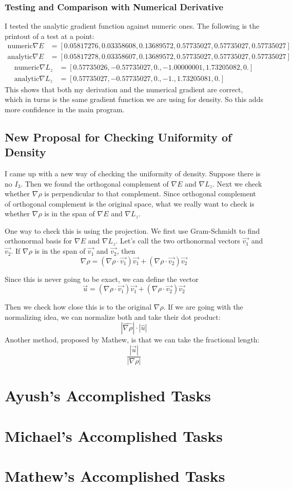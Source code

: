 \documentclass[12pt]{article}
\begin{document}
\subsubsection{Testing and Comparison with Numerical Derivative}
I tested the analytic gradient function against numeric ones. The following is the printout of a test at a point:
\begin{align*}
\text{numeric} \nabla E &=  [0.05817276, 0.03358608, 0.13689572, 0.57735027, 0.57735027, 0.57735027]\\
\text{analytic} \nabla E &= [0.05817278, 0.03358607, 0.13689572, 0.57735027, 0.57735027, 0.57735027]
\end{align*}
\begin{align*}
 \text{numeric} \nabla L_z &=  [ 0.57735026, -0.57735027,  0.,         -1.00000001,  1.73205082,  0.        ] \\
 \text{analytic} \nabla L_z &= [ 0.57735027, -0.57735027,  0.,         -1.,          1.73205081,  0.        ] 
\end{align*}
This shows that both my derivation and the numerical gradient are correct, which in turns is the same gradient function we are using for density. So this adds more confidence in the main program.

\subsection{New Proposal for Checking Uniformity of Density}
I came up with a new way of checking the uniformity of density. Suppose there is  no $I_3$. Then we found the orthogonal complement of $\nabla E$ and $\nabla L_z$. Next we check whether $\nabla \rho$ is perpendicular to that complement. Since orthogonal complement of orthogonal complement is the original space, what we really want to check is whether $\nabla \rho$ is in the span of $\nabla E$ and $\nabla L_z$.

One way to check this is using the projection. We first use Gram-Schmidt to find orthonormal basis for $\nabla E$ and $\nabla L_z$. Let's call the two orthonormal vectors $\vec{v_1}$ and $\vec{v_2}$. If $\nabla \rho$ is in the span of $\vec{v_1}$ and $\vec{v_2}$, then $$\nabla \rho = (\nabla \rho \cdot \vec{v_1}) \vec{v_1} + (\nabla \rho \cdot \vec{v_2}) \vec{v_2} $$

Since this is never going to be exact, we can define the vector
$$ \vec{u} = (\nabla \rho \cdot \vec{v_1}) \vec{v_1} + (\nabla \rho \cdot \vec{v_2}) \vec{v_2} $$

Then we check how close this is to the original $\nabla \rho$. If we are going with the normalizing idea, we can normalize both and take their dot product:
$$ |\hat{\nabla \rho}| \cdot |\hat{u}| $$
Another method, proposed by Mathew, is that we can take the fractional length:
$$ \frac{|\vec{u}|}{|\nabla \rho|} $$

\section{Ayush’s Accomplished Tasks}


\section{Michael's Accomplished Tasks}


\section{Mathew's Accomplished Tasks}
\end{document}
